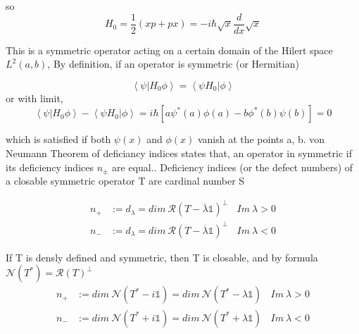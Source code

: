 \documentclass[12pt, letterpaper]{article}
\newcommand*{\1}{\hspace{1pt}}
\begin{document}
        so 
        \begin{equation}
            H_{0} = \frac{1}{2}\left(xp + px\right) = -i\hbar\sqrt{x}\frac{d}{dx}\sqrt{x}
        \end{equation}
        

        This is a symmetric operator acting on a certain domain of the Hilert space $L^{2}(a,b)$, By definition, if an operator is symmetric (or Hermitian)\cite{s5}

        \begin{equation}
            \left\langle\psi | H_{0}\phi \right\rangle = \left\langle\psi H_{0} |\phi \right\rangle
        \end{equation}
         or with limit,
        \begin{equation}
            \left\langle\psi | H_{0}\phi \right\rangle - \left\langle\psi H_{0} |\phi \right\rangle = i \hbar \left[a\psi ^{*}(a)\phi(a) - b\phi ^{*}(b)\psi(b)\right] = 0
        \end{equation}
        
        which is satisfied if both $\psi (x)$ and $\phi (x)$ vanish at the points a, b. von Neumann Theorem of deficiancy indices states that, an operator in symmetric if its deficiency
        indices $n_{\pm }$ are equal.\cite{s6}. Deficiency indices (or the defect numbers) of a closable symmetric operator T are cardinal number S

        \begin{equation}
            \begin{split}
                n_{+} &:= d_{\lambda}  = dim \ \mathcal{R} (T-\overline{\lambda}\mathds{1})^{\perp }  \ \ \ \    Im \ \lambda > 0 \\
                n_{-} &:= d_{\lambda}  = dim \ \mathcal{R} (T-\overline{\lambda}\mathds{1})^{\perp }  \ \ \ \    Im \ \lambda < 0 
            \end{split}
        \end{equation}

        If T is densly defined and symmetric, then T is closable, and by formula $\mathcal{N}(T^{*}) = \mathcal{R}(T)^{\perp}$
        \begin{equation}
            \begin{split}
                n_{+} &:= dim \ \mathcal{N} (T^{*}-i\mathds{1})  = dim \ \mathcal{N} (T^{*}-\lambda \mathds{1})  \ \ \ \    Im \ \lambda > 0 \\
                n_{-} &:= dim \ \mathcal{N} (T^{*}+i\mathds{1})  = dim \ \mathcal{N} (T^{*}+\lambda \mathds{1})  \ \ \ \    Im \ \lambda < 0 
            \end{split}
        \end{equation}
\end{document}
